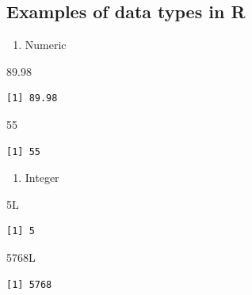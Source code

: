 \documentclass[
  letterpaper,
  DIV=11,
  numbers=noendperiod]{scrreprt}
\newenvironment{Shaded}{\begin{snugshade}}{\end{snugshade}}
\newcommand{\DecValTok}[1]{\textcolor[rgb]{0.68,0.00,0.00}{#1}}
\newcommand{\FloatTok}[1]{\textcolor[rgb]{0.68,0.00,0.00}{#1}}
\newcommand{\NormalTok}[1]{\textcolor[rgb]{0.00,0.23,0.31}{#1}}
\providecommand{\tightlist}{%
  \setlength{\itemsep}{0pt}\setlength{\parskip}{0pt}}\usepackage{longtable,booktabs,array}
\begin{document}
\subsection{Examples of data types in
R}\label{examples-of-data-types-in-r}

\begin{enumerate}
\def\labelenumi{\arabic{enumi}.}
\tightlist
\item
  Numeric
\end{enumerate}

\begin{Shaded}
\begin{Highlighting}[]
\FloatTok{89.98}
\end{Highlighting}
\end{Shaded}

\begin{verbatim}
[1] 89.98
\end{verbatim}

\begin{Shaded}
\begin{Highlighting}[]
\DecValTok{55}
\end{Highlighting}
\end{Shaded}

\begin{verbatim}
[1] 55
\end{verbatim}

\begin{enumerate}
\def\labelenumi{\arabic{enumi}.}
\setcounter{enumi}{1}
\tightlist
\item
  Integer
\end{enumerate}

\begin{Shaded}
\begin{Highlighting}[]
\DecValTok{5}\NormalTok{L}
\end{Highlighting}
\end{Shaded}

\begin{verbatim}
[1] 5
\end{verbatim}

\begin{Shaded}
\begin{Highlighting}[]
\DecValTok{5768}\NormalTok{L}
\end{Highlighting}
\end{Shaded}

\begin{verbatim}
[1] 5768
\end{verbatim}
\end{document}
